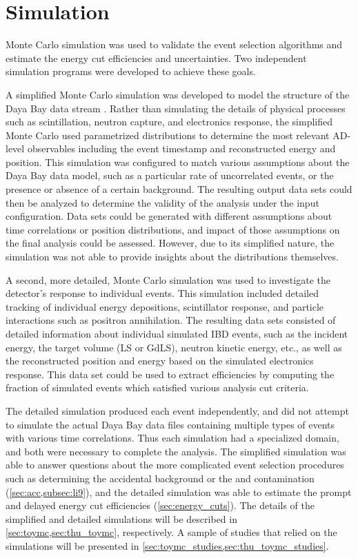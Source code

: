\chapter{Simulation}
\label{ch:simulation}

Monte Carlo simulation was used to validate the event selection algorithms
and estimate the energy cut efficiencies and uncertainties.
Two independent simulation programs were developed to achieve these goals.

A simplified Monte Carlo simulation was developed to model the structure
of the Daya Bay data stream \cite{dyb_toymc, dyb_toymc_docdb}.
Rather than simulating the details of physical processes such as scintillation,
neutron capture, and electronics response,
the simplified Monte Carlo used parametrized distributions
to determine the most relevant AD-level observables including the event timestamp
and reconstructed energy and position.
This simulation was configured to match various assumptions
about the Daya Bay data model,
such as a particular rate of uncorrelated events,
or the presence or absence of a certain background.
The resulting output data sets could then be analyzed
to determine the validity of the analysis
under the input configuration.
Data sets could be generated with different assumptions
about time correlations or position distributions,
and impact of those assumptions on the final analysis could be assessed.
However, due to its simplified nature,
the simulation was not able to provide insights about the distributions themselves.

A second, more detailed, Monte Carlo simulation was used
to investigate the detector's response to individual events.
This simulation included detailed tracking of individual energy depositions,
scintillator response, and particle interactions such as positron annihilation.
The resulting data sets consisted of detailed information about individual
simulated IBD events,
such as the incident \nuebar{} energy, the target volume (LS or GdLS),
neutron kinetic energy, etc.,
as well as the reconstructed position and energy
based on the simulated electronics response.
This data set could be used to extract efficiencies
by computing the fraction of simulated events which satisfied
various analysis cut criteria.

The detailed simulation produced each event independently,
and did not attempt to simulate the actual Daya Bay data files
containing multiple types of events with various time correlations.
Thus each simulation had a specialized domain,
and both were necessary to complete the analysis.
The simplified simulation was able to answer questions about the more complicated
event selection procedures such as determining the accidental background
or the \li{} and \he{} contamination (\cref{sec:acc,subsec:li9}),
and the detailed simulation was able to estimate
the prompt and delayed energy cut efficiencies (\cref{sec:energy_cuts}).
The details of the simplified and detailed simulations will be described
in \cref{sec:toymc,sec:thu_toymc}, respectively.
A sample of studies that relied on the simulations will be presented
in \cref{sec:toymc_studies,sec:thu_toymc_studies}.

